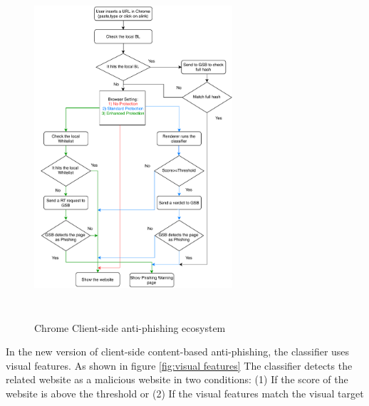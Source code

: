 \begin{figure}[h!]
\centering
\includegraphics[height=5.0in, width=2.9in]{figures/chrome-ecosystem.pdf}
\caption{Chrome Client-side anti-phishing ecosystem}
\label{fig:Chrome client side anti-phishing flowchart}
\end{figure} 

In the new version of client-side content-based anti-phishing, the classifier uses visual features. As shown in figure \ref{fig:visual features} The classifier detects the related website as a malicious website in two conditions: (1) If the score of the website is above the threshold or (2) If the visual features match the visual target

